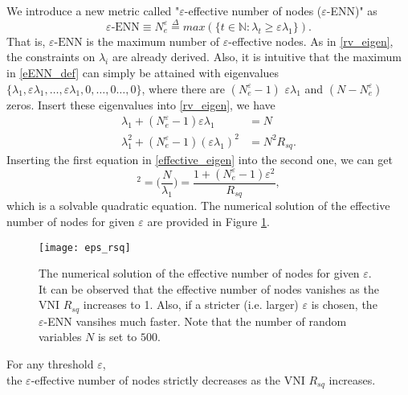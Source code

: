 We introduce a new metric called "$\varepsilon$-effective number of nodes ($\varepsilon$-ENN)" as
\begin{equation}
    \varepsilon\text{-ENN}
    \equiv N_{e}^\varepsilon
    \overset{\Delta}{=}max(\{t\in\mathbb{N}: \lambda_t\geq\varepsilon\lambda_1\}).
    \label{eENN_def}
\end{equation}
That is, $\varepsilon\text{-ENN}$ is the maximum number of $\varepsilon$-effective nodes.
As in \eqref{rv_eigen}, the constraints on $\lambda_i$ are already derived.
Also, it is intuitive that the maximum in \eqref{eENN_def} can simply be attained with eigenvalues
$\{\lambda_1, \varepsilon\lambda_1, \dots, \varepsilon\lambda_1, 0, \dots, 0\dots, 0\}$, where there are 
$(N_{e}^\varepsilon-1)$ $\varepsilon\lambda_1$ and $(N-N_e^\varepsilon)$ zeros.
Insert these eigenvalues into \eqref{rv_eigen}, we have
\begin{equation}
    \begin{aligned}
        \lambda_1+(N_e^\varepsilon-1)\varepsilon\lambda_1 &= N \\
        \lambda_1^2+(N_e^\varepsilon-1)(\varepsilon\lambda_1)^2 &= N^2R_{sq}.
    \end{aligned}
    \label{effective_eigen}
\end{equation}
Inserting the first equation in \eqref{effective_eigen} into the second one, we can get
\begin{equation}
    [1+(N_e^\varepsilon-1)\varepsilon]^2
    =\Big(\frac{N}{\lambda_1}\Big)
    =\frac{1+(N_e^\varepsilon-1)\varepsilon^2}{R_{sq}},
    \label{quad_eenn}
\end{equation}
which is a solvable quadratic equation. The numerical solution of the effective number of nodes for
given $\varepsilon$ are provided in Figure \ref{fig:eps_rsq}.

\begin{figure}[h]
    \centering
    \texttt{[image: eps\_rsq]}
    \caption[The effective number of nodes to the VNI $R_{sq}$]
    {The numerical solution of the effective number of nodes for given $\varepsilon$.
    It can be observed that the effective number of nodes vanishes as the VNI $R_{sq}$ increases to 1.
    Also, if a stricter (i.e. larger) $\varepsilon$ is chosen, the $\varepsilon$-ENN vansihes much
    faster.
    Note that the number of random variables $N$ is set to $500$.
    }
    \label{fig:eps_rsq}
\end{figure}

\begin{theorem}
    \label{oppo}
    For any threshold $\varepsilon$, 
    \\the $\varepsilon$-effective number of nodes strictly decreases as the VNI $R_{sq}$ increases.
\end{theorem}

